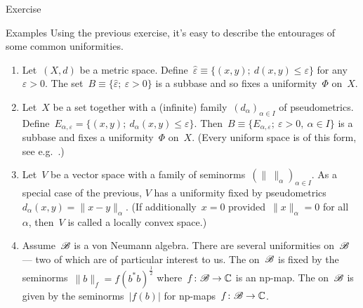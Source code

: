 \begin{parsec}
\begin{point}{Exercise}
\end{point}
\begin{point}{Examples}%
Using the previous exercise, it's easy
to describe the entourages of some common uniformities.
    \begin{enumerate}
        \item
    Let~$(X,d)$ be a metric space.
Define~$\hat\varepsilon \equiv \{(x,y);\ d(x,y) \leq \varepsilon\}$
for any $\varepsilon > 0$.
The set~$B \equiv \{ \hat\varepsilon; \ \varepsilon > 0\}$
is a subbase and so fixes a uniformity~$\Phi$ on~$X$.
        \item
    Let~$X$ be a set together with a (infinite)
            family~$(d_{\alpha})_{\alpha\in I}$
        of pseudometrics.
    Define~$E_{\alpha,\varepsilon} = \{ (x,y); \ d_\alpha(x,y)
            \leq \varepsilon\}$.
            Then~$B \equiv \{ E_{\alpha,\varepsilon}; \ \varepsilon > 0, \ 
                    \alpha \in I\}$
                    is a subbase and fixes
                    a uniformity~$\Phi$ on~$X$.
(Every uniform space is of this form, see e.g.~\cite[Thm.~39.11]{willard}.)
\item
Let~$V$ be a vector space with a
family of seminorms~$(\|\  \|_\alpha)_{\alpha \in I}$.
As a special case of the previous,
 $V$ has a uniformity fixed by
    pseudometrics~$d_\alpha(x,y) = \|x-y\|_\alpha$.
    (If additionally~$x =0$ provided~$\|x\|_\alpha = 0$ for all~$\alpha$,
    then~$V$ is called a locally convex space.)

\item
Assume~$\mathscr{B}$ is a von Neumann algebra.
There are several uniformities on~$\mathscr{B}$ --- two of which
    are of particular interest to us.
    The  on~$\mathscr{B}$
is fixed by the seminorms~$\|b\|_f = f(b^*b)^{\frac{1}{2}}$
        where~$f\colon \mathscr{B} \to \mathbb{C}$ is an np-map.
        The  on~$\mathscr{B}$
    is given by the seminorms~$|f(b)|$
        for np-maps~$f\colon \mathscr{B} \to \mathbb{C}$.


\end{enumerate}
\end{point}
\end{parsec}
